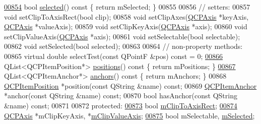 \begin{DoxyCode}
\hypertarget{a00116_source_l00854}{}\hyperlink{a00022_a225865808640d8d9a7dd19f09a2e93f2}{00854}   \textcolor{keywordtype}{bool} \hyperlink{a00022_a225865808640d8d9a7dd19f09a2e93f2}{selected}()\textcolor{keyword}{ const }\{ \textcolor{keywordflow}{return} mSelected; \}
00855   
00856   \textcolor{comment}{// setters:}
00857   \textcolor{keywordtype}{void} setClipToAxisRect(\textcolor{keywordtype}{bool} clip);
00858   \textcolor{keywordtype}{void} setClipAxes(\hyperlink{a00025}{QCPAxis} *keyAxis, \hyperlink{a00025}{QCPAxis} *valueAxis);
00859   \textcolor{keywordtype}{void} setClipKeyAxis(\hyperlink{a00025}{QCPAxis} *axis);
00860   \textcolor{keywordtype}{void} setClipValueAxis(\hyperlink{a00025}{QCPAxis} *axis);
00861   \textcolor{keywordtype}{void} setSelectable(\textcolor{keywordtype}{bool} selectable);
00862   \textcolor{keywordtype}{void} setSelected(\textcolor{keywordtype}{bool} selected);
00863   
00864   \textcolor{comment}{// non-property methods:}
00865   \textcolor{keyword}{virtual} \textcolor{keywordtype}{double} selectTest(\textcolor{keyword}{const} QPointF &pos) \textcolor{keyword}{const} = 0;
\hypertarget{a00116_source_l00866}{}\hyperlink{a00022_adf6a680cc29a6bce8345c3b6af3a91a1}{00866}   QList<QCPItemPosition*> \hyperlink{a00022_adf6a680cc29a6bce8345c3b6af3a91a1}{positions}()\textcolor{keyword}{ const }\{ \textcolor{keywordflow}{return} mPositions; \}
\hypertarget{a00116_source_l00867}{}\hyperlink{a00022_a8454b9941960b840608a5a1e00b1977d}{00867}   QList<QCPItemAnchor*> \hyperlink{a00022_a8454b9941960b840608a5a1e00b1977d}{anchors}()\textcolor{keyword}{ const }\{ \textcolor{keywordflow}{return} mAnchors; \}
00868   \hyperlink{a00038}{QCPItemPosition} *position(\textcolor{keyword}{const} QString &name) \textcolor{keyword}{const};
00869   \hyperlink{a00032}{QCPItemAnchor} *anchor(\textcolor{keyword}{const} QString &name) \textcolor{keyword}{const};
00870   \textcolor{keywordtype}{bool} hasAnchor(\textcolor{keyword}{const} QString &name) \textcolor{keyword}{const};
00871   
00872 \textcolor{keyword}{protected}:
\hypertarget{a00116_source_l00873}{}\hyperlink{a00022_ad2a70ff6b658fcb84a9427f69d3f587d}{00873}   \textcolor{keywordtype}{bool} \hyperlink{a00022_ad2a70ff6b658fcb84a9427f69d3f587d}{mClipToAxisRect};
\hypertarget{a00116_source_l00874}{}\hyperlink{a00022_a5305649de1638fcd59b4356f101d81a9}{00874}   \hyperlink{a00025}{QCPAxis} *mClipKeyAxis, *\hyperlink{a00022_a5305649de1638fcd59b4356f101d81a9}{mClipValueAxis};
\hypertarget{a00116_source_l00875}{}\hyperlink{a00022_a4bdb3457dad1d268c0f78a44152b9645}{00875}   \textcolor{keywordtype}{bool} mSelectable, \hyperlink{a00022_a4bdb3457dad1d268c0f78a44152b9645}{mSelected};

\end{DoxyCode}
